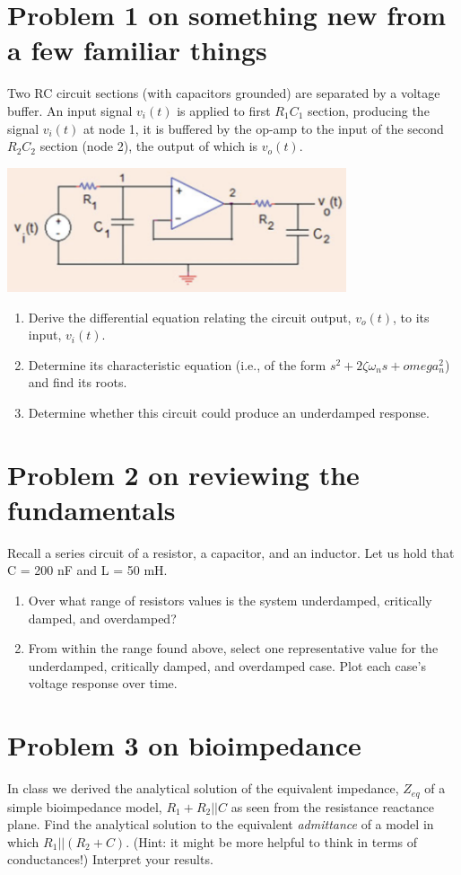 \documentclass[11pt]{book}
\begin{document}
\section{Problem 1 on something new from a few familiar things}
Two RC circuit sections (with capacitors grounded) are separated by a voltage buffer. An input signal $v_i(t)$ is applied to first $R_1C_1$ section, producing the signal $v_i(t)$ at node 1, it is buffered by the op-amp to the input of the second $R_2C_2$ section (node 2), the output of which is $v_o(t)$.
\begin{center}
	\includegraphics[width=0.75\textwidth]{figures/hw5.01.png}
\end{center}
\begin{enumerate}
	\item Derive the differential equation relating the circuit output, $v_o(t)$, to its input, $v_i(t)$.
	\item Determine its characteristic equation (i.e., of the form $s^2 + 2\zeta \omega_n s + omega_n^2$) and find its roots.
	\item Determine whether this circuit could produce an underdamped response.
\end{enumerate}

\newpage

\section{Problem 2 on reviewing the fundamentals}
Recall a series circuit of a resistor, a capacitor, and an inductor. Let us hold that C = 200 nF and L = 50 mH.
\begin{enumerate}
	\item Over what range of resistors values is the system underdamped, critically damped, and overdamped?
	\item From within the range found above, select one representative value for the underdamped, critically damped, and overdamped case. Plot each case’s voltage response over time.
\end{enumerate}

\section{Problem 3 on bioimpedance}
In class we derived the analytical solution of the equivalent impedance, $Z_{eq}$ of a simple bioimpedance model, $R_1 + R_2\vert\vert C$ as seen from the resistance reactance plane. Find the analytical solution to the equivalent \textit{admittance} of a model in which $R_1\vert\vert(R_2 + C)$. (Hint: it might be more helpful to think in terms of conductances!) Interpret your results.
\end{document}
